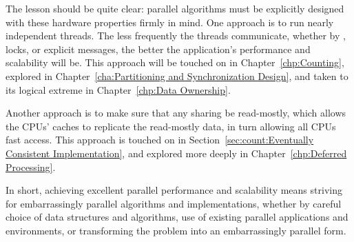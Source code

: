 The lesson should be quite clear:
parallel algorithms must be explicitly designed with these hardware
properties firmly in mind.
One approach is to run nearly independent threads.
The less frequently the threads communicate, whether by
,
locks, or explicit messages, the better the application's performance
and scalability will be.
This approach will be touched on in
Chapter~\ref{chp:Counting},
explored in
Chapter~\ref{cha:Partitioning and Synchronization Design},
and taken to its logical extreme in
Chapter~\ref{chp:Data Ownership}.

Another approach is to make sure that any sharing be read-mostly, which
allows the CPUs' caches to replicate the read-mostly data, in turn
allowing all CPUs fast access.
This approach is touched on in
Section~\ref{sec:count:Eventually Consistent Implementation},
and explored more deeply in
Chapter~\ref{chp:Deferred Processing}.

In short, achieving excellent parallel performance and scalability means
striving for embarrassingly parallel algorithms and implementations,
whether by careful choice of data structures and algorithms, use of
existing parallel applications and environments, or transforming the
problem into an embarrassingly parallel form.

\QuickQuizEnd
